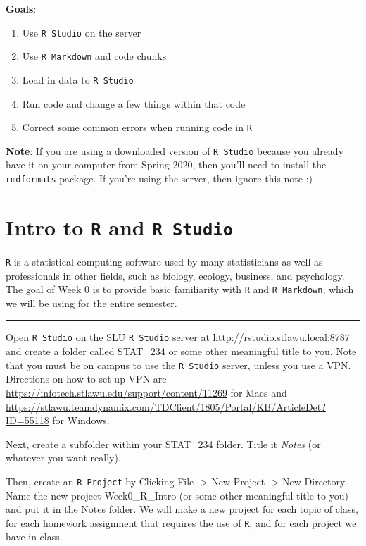 \documentclass[
]{book}
\begin{document}
\textbf{Goals}:

\begin{enumerate}
\def\labelenumi{\arabic{enumi}.}
\item
  Use \texttt{R\ Studio} on the server
\item
  Use \texttt{R\ Markdown} and code chunks
\item
  Load in data to \texttt{R\ Studio}
\item
  Run code and change a few things within that code
\item
  Correct some common errors when running code in \texttt{R}
\end{enumerate}

\textbf{Note}: If you are using a downloaded version of \texttt{R\ Studio} because you already have it on your computer from Spring 2020, then you'll need to install the \texttt{rmdformats} package. If you're using the server, then ignore this note :)

\hypertarget{intro-to-r-and-r-studio}{%
\section{\texorpdfstring{Intro to \texttt{R} and \texttt{R\ Studio}}{Intro to R and R Studio}}\label{intro-to-r-and-r-studio}}

\texttt{R} is a statistical computing software used by many statisticians as well as professionals in other fields, such as biology, ecology, business, and psychology. The goal of Week 0 is to provide basic familiarity with \texttt{R} and \texttt{R\ Markdown}, which we will be using for the entire semester.

\begin{center}\rule{0.5\linewidth}{0.5pt}\end{center}

Open \texttt{R\ Studio} on the SLU \texttt{R\ Studio} server at \url{http://rstudio.stlawu.local:8787} and create a folder called STAT\_234 or some other meaningful title to you. Note that you must be on campus to use the \texttt{R\ Studio} server, unless you use a VPN. Directions on how to set-up VPN are \url{https://infotech.stlawu.edu/support/content/11269} for Macs and \url{https://stlawu.teamdynamix.com/TDClient/1805/Portal/KB/ArticleDet?ID=55118} for Windows.

Next, create a subfolder within your STAT\_234 folder. Title it \emph{Notes} (or whatever you want really).

Then, create an \texttt{R\ Project} by Clicking File -\textgreater{} New Project -\textgreater{} New Directory. Name the new project Week0\_R\_Intro (or some other meaningful title to you) and put it in the Notes folder. We will make a new project for each topic of class, for each homework assignment that requires the use of \texttt{R}, and for each project we have in class.
\end{document}
